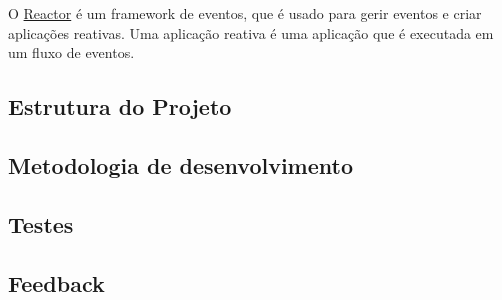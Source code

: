 O \href{https://projectreactor.io/}{Reactor} é um framework de eventos, que é usado para gerir eventos e criar aplicações reativas. Uma aplicação reativa é uma aplicação que é executada em um fluxo de eventos.

\subsection{Estrutura do Projeto}



\subsection{Metodologia de desenvolvimento}



\subsection{Testes}



\subsection{Feedback}


